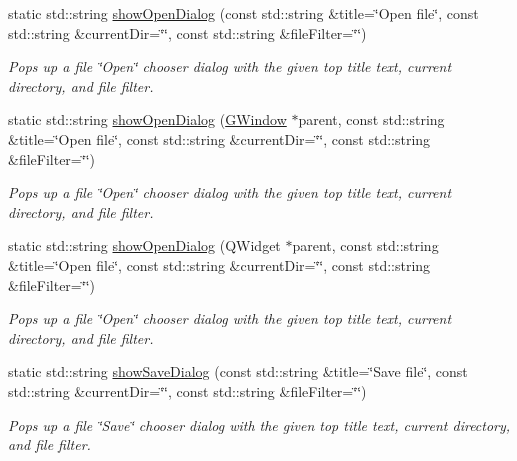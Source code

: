 \begin{DoxyCompactItemize}
\item 
static std\+::string \mbox{\hyperlink{classsgl_1_1GFileChooser_abe21d73a151b976a4f639005b9652407}{show\+Open\+Dialog}} (const std\+::string \&title=\char`\"{}Open file\char`\"{}, const std\+::string \&current\+Dir=\char`\"{}\char`\"{}, const std\+::string \&file\+Filter=\char`\"{}\char`\"{})
\begin{DoxyCompactList}\small\item\em Pops up a file \char`\"{}\+Open\char`\"{} chooser dialog with the given top title text, current directory, and file filter. \end{DoxyCompactList}\item 
static std\+::string \mbox{\hyperlink{classsgl_1_1GFileChooser_aceba7f99cdc44bebbb08a67a9ba32ab0}{show\+Open\+Dialog}} (\mbox{\hyperlink{classsgl_1_1GWindow}{G\+Window}} $\ast$parent, const std\+::string \&title=\char`\"{}Open file\char`\"{}, const std\+::string \&current\+Dir=\char`\"{}\char`\"{}, const std\+::string \&file\+Filter=\char`\"{}\char`\"{})
\begin{DoxyCompactList}\small\item\em Pops up a file \char`\"{}\+Open\char`\"{} chooser dialog with the given top title text, current directory, and file filter. \end{DoxyCompactList}\item 
static std\+::string \mbox{\hyperlink{classsgl_1_1GFileChooser_a1afbae9ad77732453d6978d3f643ce0b}{show\+Open\+Dialog}} (Q\+Widget $\ast$parent, const std\+::string \&title=\char`\"{}Open file\char`\"{}, const std\+::string \&current\+Dir=\char`\"{}\char`\"{}, const std\+::string \&file\+Filter=\char`\"{}\char`\"{})
\begin{DoxyCompactList}\small\item\em Pops up a file \char`\"{}\+Open\char`\"{} chooser dialog with the given top title text, current directory, and file filter. \end{DoxyCompactList}\item 
static std\+::string \mbox{\hyperlink{classsgl_1_1GFileChooser_a67fbf8f6091d781f22431051e3e83561}{show\+Save\+Dialog}} (const std\+::string \&title=\char`\"{}Save file\char`\"{}, const std\+::string \&current\+Dir=\char`\"{}\char`\"{}, const std\+::string \&file\+Filter=\char`\"{}\char`\"{})
\begin{DoxyCompactList}\small\item\em Pops up a file \char`\"{}\+Save\char`\"{} chooser dialog with the given top title text, current directory, and file filter. \end{DoxyCompactList}\item 

\end{DoxyCompactItemize}
